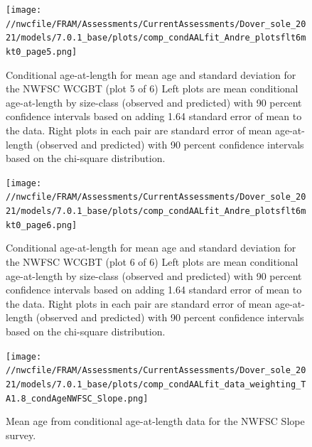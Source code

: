 \documentclass[11pt,
  english,
  a4paper,
]{article}
\begin{document}
\begin{figure}
\centering
\texttt{[image: //nwcfile/FRAM/Assessments/CurrentAssessments/Dover\_sole\_2021/models/7.0.1\_base/plots/comp\_condAALfit\_Andre\_plotsflt6mkt0\_page5.png]}
\caption{Conditional age-at-length for mean age and standard deviation for the NWFSC WCGBT (plot 5 of 6) Left plots are mean conditional age-at-length by size-class (observed and predicted) with 90 percent confidence intervals based on adding 1.64 standard error of mean to the data. Right plots in each pair are standard error of mean age-at-length (observed and predicted) with 90 percent confidence intervals based on the chi-square distribution.\label{fig:wcgbt-caal-fit-5}}
\end{figure}

\tagmcend\tagstructend


\begin{figure}
\centering
\texttt{[image: //nwcfile/FRAM/Assessments/CurrentAssessments/Dover\_sole\_2021/models/7.0.1\_base/plots/comp\_condAALfit\_Andre\_plotsflt6mkt0\_page6.png]}
\caption{Conditional age-at-length for mean age and standard deviation for the NWFSC WCGBT (plot 6 of 6) Left plots are mean conditional age-at-length by size-class (observed and predicted) with 90 percent confidence intervals based on adding 1.64 standard error of mean to the data. Right plots in each pair are standard error of mean age-at-length (observed and predicted) with 90 percent confidence intervals based on the chi-square distribution.\label{fig:wcgbt-caal-fit-6}}
\end{figure}

\tagmcend\tagstructend


\begin{figure}
\centering
\texttt{[image: //nwcfile/FRAM/Assessments/CurrentAssessments/Dover\_sole\_2021/models/7.0.1\_base/plots/comp\_condAALfit\_data\_weighting\_TA1.8\_condAgeNWFSC\_Slope.png]}
\caption{Mean age from conditional age-at-length data for the NWFSC Slope survey.\label{fig:nwslope-mean-caal}}
\end{figure}
\end{document}
